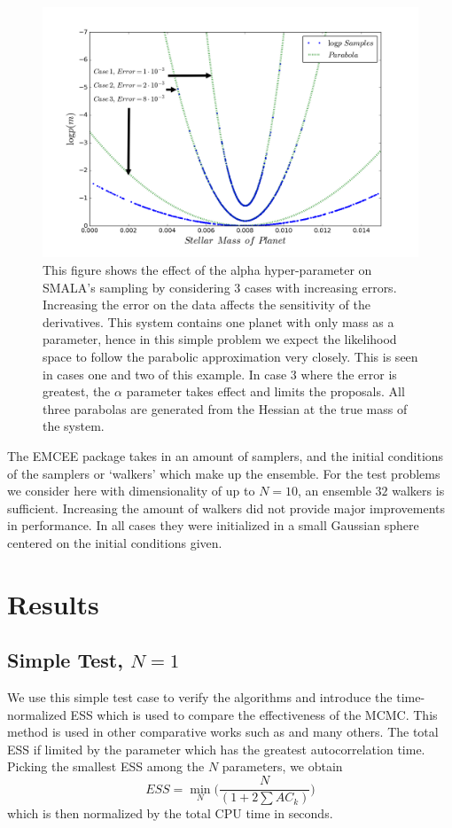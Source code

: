 \documentclass{aa}
\begin{document}
\begin{figure}
\centering
\includegraphics[width=0.95\hsize]{alpha.png}
   \caption{This figure shows the effect of the alpha hyper-parameter on SMALA's sampling by considering 3 cases with increasing errors. Increasing the error on the data affects the sensitivity of the derivatives. This system contains one planet with only mass as a parameter, hence in this simple problem we expect the likelihood space to follow the parabolic approximation very closely. This is seen in cases one and two of this example. In case 3 where the error is greatest, the $\alpha$ parameter takes effect and limits the proposals. All three parabolas are generated from the Hessian at the true mass of the system.}
      \label{alpha}
\end{figure}

The EMCEE package takes in an amount of samplers, and the initial conditions of the samplers or `walkers' which make up the ensemble. For the test problems we consider here with dimensionality of up to $N=10$, an ensemble $32$ walkers is sufficient. Increasing the amount of walkers did not provide major improvements in performance. In all cases they were initialized in a small Gaussian sphere centered on the initial conditions given.

\section{Results}\label{results}
\subsection{Simple Test, $N=1$}
We use this simple test case to verify the algorithms and introduce the time-normalized ESS which is used to compare the effectiveness of the MCMC. This method is used in other comparative works such as \cite{Girolami2011, 1504.01418, Meyer2016, Lan2015} and many others. The total ESS if limited by the parameter which has the greatest autocorrelation time. Picking the smallest ESS among the $N$ parameters, we obtain $$ESS = \min_N\bigg( \frac{N}{(1+2\sum AC_k)}\bigg)$$ which is then normalized by the total CPU time in seconds. 
\end{document}
